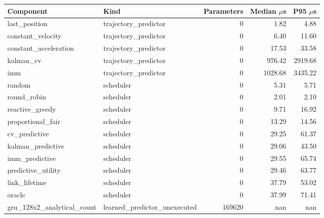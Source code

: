 \begin{tabular}{llrrr}
\toprule
Component & Kind & Parameters & Median $\mu$s & P95 $\mu$s \\
\midrule
last\_position & trajectory\_predictor & 0 & 1.82 & 4.88 \\
constant\_velocity & trajectory\_predictor & 0 & 6.40 & 11.60 \\
constant\_acceleration & trajectory\_predictor & 0 & 17.53 & 33.58 \\
kalman\_cv & trajectory\_predictor & 0 & 976.42 & 2919.68 \\
imm & trajectory\_predictor & 0 & 1028.68 & 3435.22 \\
random & scheduler & 0 & 5.31 & 5.71 \\
round\_robin & scheduler & 0 & 2.01 & 2.10 \\
reactive\_greedy & scheduler & 0 & 9.71 & 16.92 \\
proportional\_fair & scheduler & 0 & 13.29 & 14.56 \\
cv\_predictive & scheduler & 0 & 29.25 & 61.37 \\
kalman\_predictive & scheduler & 0 & 29.06 & 43.50 \\
imm\_predictive & scheduler & 0 & 29.55 & 65.74 \\
predictive\_utility & scheduler & 0 & 29.46 & 63.77 \\
link\_lifetime & scheduler & 0 & 37.79 & 53.02 \\
oracle & scheduler & 0 & 37.99 & 71.41 \\
gru\_128x2\_analytical\_count & learned\_predictor\_unexecuted & 169620 & nan & nan \\
\bottomrule
\end{tabular}
